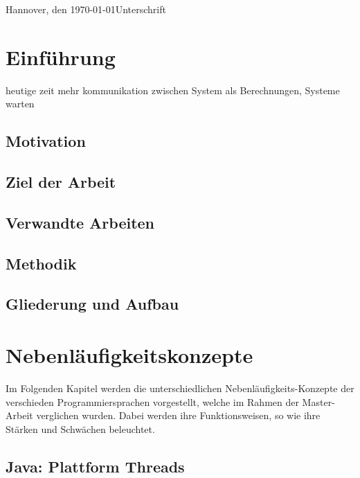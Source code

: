 \documentclass[fontsize=12pt,paper=a4,twoside=semi,parskip=half-,headsepline,headinclude]{scrreprt}
\begin{document}
Hannover, den \today \hfill Unterschrift


\newpage 
\thispagestyle{empty}
\quad 
\newpage


  \tableofcontents  %

\listoffigures      %

\listoftables       %

\chapter{Einführung}

heutige zeit mehr kommunikation zwischen System als Berechnungen, Systeme warten


\section{Motivation}

\section{Ziel der Arbeit}

\section{Verwandte Arbeiten}

\section{Methodik}

\section{Gliederung und Aufbau}



\chapter{Nebenläufigkeitskonzepte}

Im Folgenden Kapitel werden die unterschiedlichen Nebenläufigkeits-Konzepte der verschieden Programmiersprachen vorgestellt, welche im Rahmen der Master-Arbeit verglichen wurden. Dabei werden ihre Funktionsweisen, so wie ihre Stärken und Schwächen beleuchtet.

\section{Java: Plattform Threads}
\end{document}
